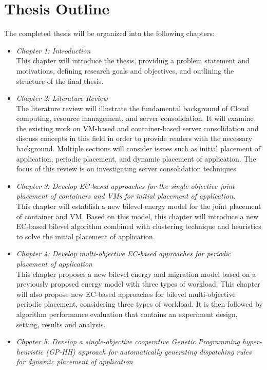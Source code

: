 \section{Thesis Outline}
The completed thesis will be organized into the following chapters:
\begin{itemize}
	\item \textit{Chapter 1: Introduction} \\
	This chapter will introduce the thesis, providing a problem statement and motivations, defining research goals and objectives, and outlining the structure of the final thesis.
	\item \textit{Chapter 2: Literature Review} \\
	The literature review will illustrate the fundamental background of Cloud computing, resource management, and server consolidation. It will examine the existing work on VM-based and container-based server consolidation and discuss concepts in this field in order to provide readers with the necessary background. Multiple sections will consider issues such as initial placement of application, periodic placement, and dynamic placement of application. The focus of this review is on investigating server consolidation techniques.
	\item \textit{Chapter 3: Develop EC-based approaches for the single objective joint placement of containers and VMs for initial placement of application.} \\
	This chapter will establish a new bilevel energy model for the joint placement of container and VM. Based on this model, this chapter will introduce a new EC-based bilevel algorithm combined with clustering technique and heuristics to solve the initial placement of application. 
	\item \textit{Chapter 4: Develop multi-objective EC-based approaches  for periodic placement of application} \\
	This chapter proposes a new bilevel energy and migration model based on a previously proposed energy model with three types of workload.  This chapter will also propose new EC-based approaches for bilevel multi-objective periodic placement, considering three types of workload. It is then followed by algorithm performance evaluation that contains an experiment design, setting, results and analysis.
	\item \textit{Chpater 5: Develop a  single-objective cooperative Genetic Programming hyper-heuristic (GP-HH) approach for automatically generating dispatching rules for dynamic placement of application} \\

\end{itemize}
